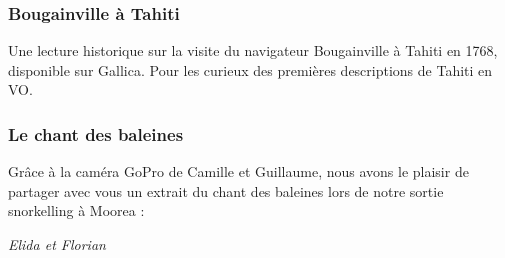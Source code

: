\hypertarget{bougainville-uxe0-tahiti}{%
\subsubsection{Bougainville à Tahiti}\label{bougainville-uxe0-tahiti}}

Une lecture historique sur la visite du navigateur Bougainville à Tahiti
en 1768, disponible sur Gallica. Pour les curieux des premières
descriptions de Tahiti en VO.

\hypertarget{le-chant-des-baleines}{%
\subsubsection{Le chant des baleines}\label{le-chant-des-baleines}}

Grâce à la caméra GoPro de Camille et Guillaume, nous avons le plaisir
de partager avec vous un extrait du chant des baleines lors de notre
sortie snorkelling à Moorea :

\emph{Elida et Florian}
